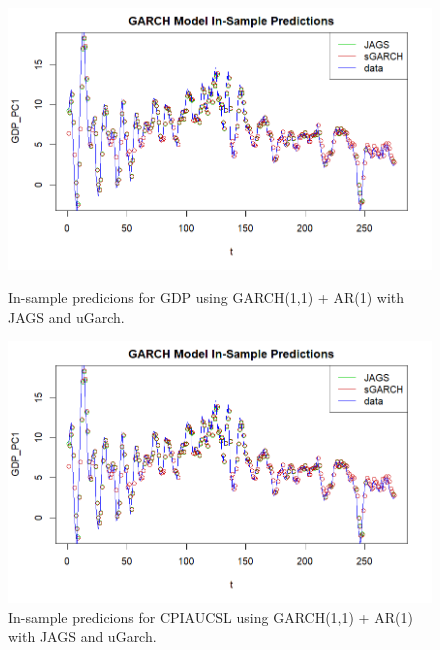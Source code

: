 \begin{figure}[H]
    \centering
    \begin{minipage}{0.49\textwidth}
        \centering
        \includegraphics[width=\textwidth]{images/5-GARCH/GARCH_predictions_gdp.png}
        \caption{In-sample predicions for GDP using GARCH(1,1) + AR(1) with JAGS and uGarch.}
        \label{fig:GARCH_gdp_prediction}
    \end{minipage}\hfill
    \begin{minipage}{0.49\textwidth}
        \centering
        \includegraphics[width=\textwidth]{images/5-GARCH/GARCH_predictions_gdp.png}
        \caption{In-sample predicions for CPIAUCSL using GARCH(1,1) + AR(1) with JAGS and uGarch.}
        \label{fig:GARCH_infl_prediction}
    \end{minipage}
\end{figure}
